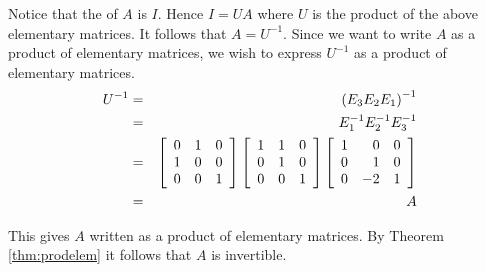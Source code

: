 \begin{solution}
Notice that the {\rref} of $A$ is $I$. Hence $I = UA$ where $U$ is the product of the above elementary matrices. It follows that $A = U^{-1}$. Since we want to write $A$ as a product of elementary matrices, we wish to express $U^{-1}$ as a product of elementary matrices. 
\begin{eqnarray*}
U^{-1} &=& \left( E_3 E_2 E_1 \right)^{-1}\\
&=& E_1^{-1} E_2^{-1} E_3^{-1} \\
&=& \left[
\begin{array}{rrr}
0 & 1 & 0 \\
1 & 0 & 0 \\
0 & 0 & 1 
\end{array} \right]
\left[
\begin{array}{rrr}
1 & 1 & 0 \\
0 & 1 & 0 \\
0 & 0 & 1 
\end{array} \right]
\left[ \begin{array}{rrr}
1 & 0 & 0 \\
0 & 1 & 0 \\
0 & -2 & 1 
\end{array} \right] \\
&=& A
\end{eqnarray*}

This gives $A$ written as a product of elementary matrices. By Theorem \ref{thm:prodelem} it follows that $A$ is invertible. 
\end{solution}
